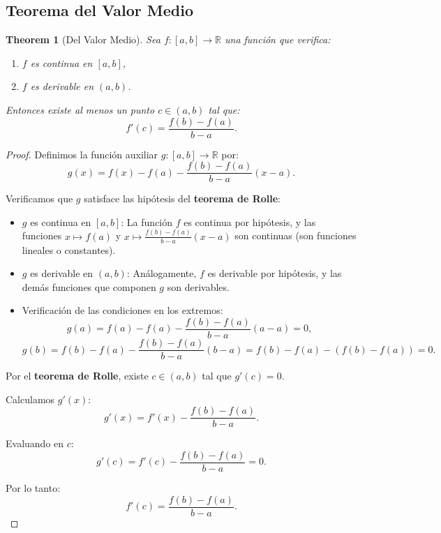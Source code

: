 \documentclass[11pt,a4paper]{article}
\theoremstyle{plain}
\newtheorem{theorem}{Theorem}[section]
\theoremstyle{definition}
\begin{document}
\subsection{Teorema del Valor Medio}

\begin{theorem}[Del Valor Medio]
Sea $f: [a,b] \to \mathbb{R}$ una función que verifica:
\begin{enumerate}
    \item $f$ es continua en $[a,b]$,
    \item $f$ es derivable en $(a,b)$.
\end{enumerate}
Entonces existe al menos un punto $c \in (a,b)$ tal que:
\[
f'(c) = \frac{f(b) - f(a)}{b - a}.
\]
\end{theorem}

\begin{proof}
Definimos la función auxiliar $g: [a,b] \to \mathbb{R}$ por:
\[
g(x) = f(x) - f(a) - \frac{f(b) - f(a)}{b - a}(x - a).
\]

Verificamos que $g$ satisface las hipótesis del \textbf{teorema de Rolle}:

\begin{itemize}
    \item $g$ es continua en $[a,b]$: La función $f$ es continua por hipótesis, y las funciones $x \mapsto f(a)$ y $x \mapsto \frac{f(b)-f(a)}{b-a}(x-a)$ son continuas (son funciones lineales o constantes).
    
    \item $g$ es derivable en $(a,b)$: Análogamente, $f$ es derivable por hipótesis, y las demás funciones que componen $g$ son derivables.
    
    \item Verificación de las condiciones en los extremos:
    \[
    g(a) = f(a) - f(a) - \frac{f(b) - f(a)}{b - a}(a - a) = 0,
    \]
    \[
    g(b) = f(b) - f(a) - \frac{f(b) - f(a)}{b - a}(b - a) = f(b) - f(a) - (f(b) - f(a)) = 0.
    \]
\end{itemize}

Por el \textbf{teorema de Rolle}, existe $c \in (a,b)$ tal que $g'(c) = 0$.

Calculamos $g'(x)$:
\[
g'(x) = f'(x) - \frac{f(b) - f(a)}{b - a}.
\]

Evaluando en $c$:
\[
g'(c) = f'(c) - \frac{f(b) - f(a)}{b - a} = 0.
\]

Por lo tanto:
\[
f'(c) = \frac{f(b) - f(a)}{b - a}.
\]
\end{proof}
\end{document}
